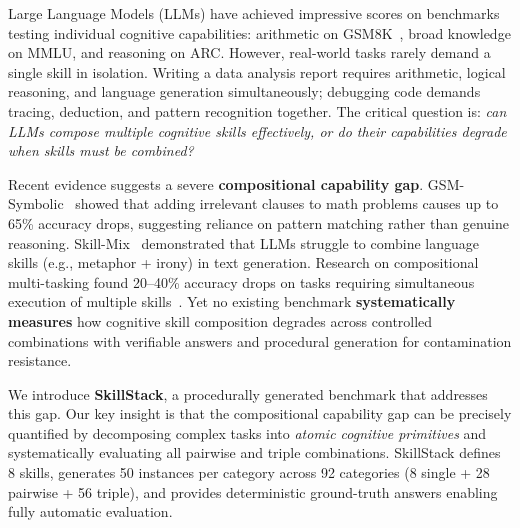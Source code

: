 \documentclass{article}
\begin{document}
Large Language Models (LLMs) have achieved impressive scores on benchmarks testing individual cognitive capabilities: arithmetic on GSM8K~\citep{cobbe2021training}, broad knowledge on MMLU, and reasoning on ARC. However, real-world tasks rarely demand a single skill in isolation. Writing a data analysis report requires arithmetic, logical reasoning, and language generation simultaneously; debugging code demands tracing, deduction, and pattern recognition together. The critical question is: \emph{can LLMs compose multiple cognitive skills effectively, or do their capabilities degrade when skills must be combined?}

Recent evidence suggests a severe \textbf{compositional capability gap}. GSM-Symbolic~\citep{mirzadeh2025gsmsymbolic} showed that adding irrelevant clauses to math problems causes up to 65\% accuracy drops, suggesting reliance on pattern matching rather than genuine reasoning. Skill-Mix~\citep{yu2024skillmix} demonstrated that LLMs struggle to combine language skills (e.g., metaphor + irony) in text generation. Research on compositional multi-tasking found 20--40\% accuracy drops on tasks requiring simultaneous execution of multiple skills~\citep{zhao2024canmodels}. Yet no existing benchmark \textbf{systematically measures} how cognitive skill composition degrades across controlled combinations with verifiable answers and procedural generation for contamination resistance.

We introduce \textbf{SkillStack}, a procedurally generated benchmark that addresses this gap. Our key insight is that the compositional capability gap can be precisely quantified by decomposing complex tasks into \emph{atomic cognitive primitives} and systematically evaluating all pairwise and triple combinations. SkillStack defines 8 skills, generates 50 instances per category across 92 categories (8 single + 28 pairwise + 56 triple), and provides deterministic ground-truth answers enabling fully automatic evaluation.
\end{document}
